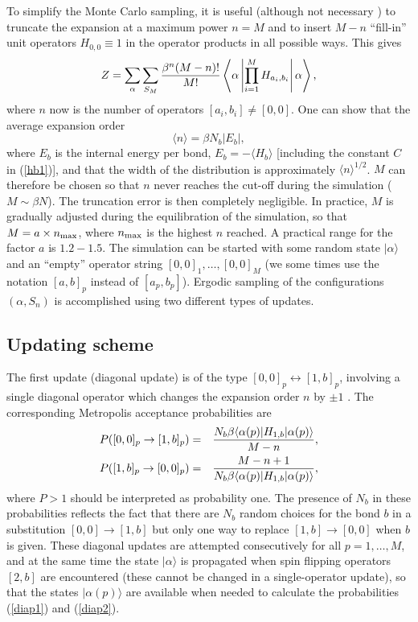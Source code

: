 \documentclass[10pt,pre,aps,twocolumn,showpacs,superscriptaddress,
floatfix]{revtex4}
\begin{document}
To simplify the Monte Carlo sampling, it is useful \cite{sse1} (although not 
necessary \cite{sse2}) to truncate the expansion at a maximum power $n = M$ 
and to insert $M-n$ ``fill-in'' unit operators $H_{0,0} \equiv 1$ in the 
operator products in all possible ways. This gives
\begin{equation}
Z = \sum\limits_\alpha \sum_{S_M} {\beta^n(M-n)! \over M!} 
    \left \langle \alpha  \left | \prod_{i=1}^M H_{a_i,b_i} 
    \right | \alpha \right \rangle ,
\label{zm}
\end{equation}
where $n$ now is the number of operators $[a_i,b_i] \not= [0,0]$. One can show
that {\cite{sse1,handscomb}} the average expansion order
\begin{equation}
\langle n \rangle = \beta N_b|E_b|,
\label{avn}
\end{equation}
where $E_b$ is the internal energy per bond, $E_b =-\langle H_b\rangle$ 
[including the constant $C$ in (\ref{hb1})], and that the 
width of the distribution is approximately $\langle n\rangle ^{1/2}$. $M$ can 
therefore be chosen so that $n$ never reaches the cut-off during the 
simulation ($M \sim \beta N$). The truncation error is then completely 
negligible. In practice, $M$ is gradually adjusted during the 
equilibration of the simulation, so that $M=a\times n_{\rm max}$, where 
$n_{\rm max}$ is the highest $n$ reached. A practical range for the factor 
$a$ is $1.2-1.5$. The simulation can be started with some random state 
$|\alpha \rangle$ and an ``empty'' operator string  $[0,0]_1,\ldots, [0,0]_M$ 
(we some times use the notation $[a,b]_p$ instead of $[a_p,b_p]$). Ergodic 
sampling of the configurations $(\alpha, S_n)$ is accomplished using two 
different types of updates.

\subsection{Updating scheme \label{section_oploop}}

The first update (diagonal update) is of the type $[0,0]_p \leftrightarrow 
[1,b]_p$, involving a single diagonal operator which changes the expansion 
order $n$ by $\pm 1$ \cite{sse4}. The corresponding Metropolis acceptance 
probabilities are
\begin{eqnarray}
P([0,0]_p \to [1,b]_p) & = & 
{N_b\beta \langle \alpha (p)| H_{1,b} | \alpha (p) \rangle \over M-n }, 
\label{diap1} \\
P([1,b]_p \to [0,0]_p) & = &
{M-n+1 \over N_b\beta \langle \alpha (p)| H_{1,b} | \alpha (p) \rangle },
\label{diap2}
\end{eqnarray}
where $P>1$ should be interpreted as probability one. The presence of $N_b$ in
these probabilities reflects the fact that there are $N_b$ random choices for 
the bond $b$ in a substitution $[0,0]\to [1,b]$ but only one way to replace 
$[1,b]\to [0,0]$ when $b$ is given. These diagonal updates are attempted 
consecutively for all $p=1,\ldots,M$, and at the same time the state 
$|\alpha \rangle$ is propagated when spin flipping operators $[2,b]$ are 
encountered (these cannot be changed in a single-operator update), so that 
the states $| \alpha (p) \rangle$ are available when needed to calculate 
the probabilities (\ref{diap1}) and (\ref{diap2}). 
\end{document}
